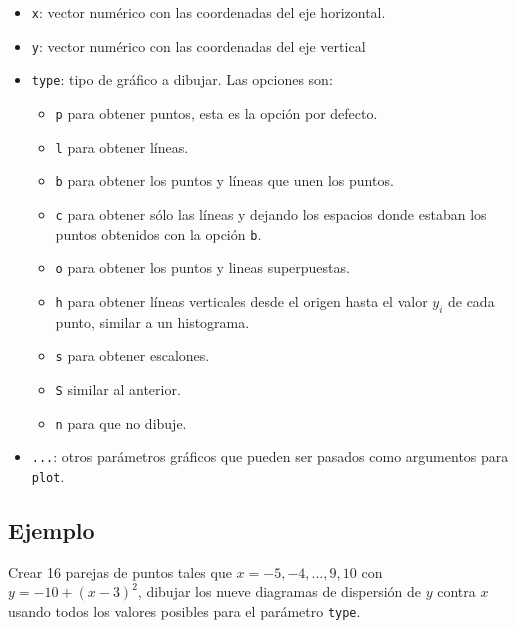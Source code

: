 \documentclass[10pt,]{krantz}
\providecommand{\tightlist}{%
  \setlength{\itemsep}{0pt}\setlength{\parskip}{0pt}}
\begin{document}
\begin{itemize}
\tightlist
\item
  \texttt{x}: vector numérico con las coordenadas del eje horizontal.
\item
  \texttt{y}: vector numérico con las coordenadas del eje vertical
\item
  \texttt{type}: tipo de gráfico a dibujar. Las opciones son:
  \label{type}

  \begin{itemize}
  \tightlist
  \item
    \texttt{\textquotesingle{}p\textquotesingle{}} para obtener puntos,
    esta es la opción por defecto.
  \item
    \texttt{\textquotesingle{}l\textquotesingle{}} para obtener líneas.
  \item
    \texttt{\textquotesingle{}b\textquotesingle{}} para obtener los
    puntos y líneas que unen los puntos.
  \item
    \texttt{\textquotesingle{}c\textquotesingle{}} para obtener sólo las
    líneas y dejando los espacios donde estaban los puntos obtenidos con
    la opción \texttt{\textquotesingle{}b\textquotesingle{}}.
  \item
    \texttt{\textquotesingle{}o\textquotesingle{}} para obtener los
    puntos y lineas superpuestas.
  \item
    \texttt{\textquotesingle{}h\textquotesingle{}} para obtener líneas
    verticales desde el origen hasta el valor \(y_i\) de cada punto,
    similar a un histograma.
  \item
    \texttt{\textquotesingle{}s\textquotesingle{}} para obtener
    escalones.
  \item
    \texttt{\textquotesingle{}S\textquotesingle{}} similar al anterior.
  \item
    \texttt{\textquotesingle{}n\textquotesingle{}} para que no dibuje.
  \end{itemize}
\item
  \texttt{...}: otros parámetros gráficos que pueden ser pasados como
  argumentos para \texttt{plot}.
\end{itemize}

\subsection*{Ejemplo}\label{ejemplo-8}


Crear 16 parejas de puntos tales que \(x=-5, -4, \ldots, 9, 10\) con
\(y=-10+(x-3)^2\), dibujar los nueve diagramas de dispersión de \(y\)
contra \(x\) usando todos los valores posibles para el parámetro
\texttt{type}.
\end{document}

